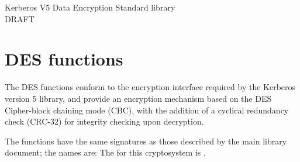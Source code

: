\setlength{\oddsidemargin}{0.25in}
\setlength{\evensidemargin}{-0.25in}
\setlength{\topmargin}{-.5in}
\setlength{\textheight}{9in}
\setlength{\parskip}{.1in}
\setlength{\parindent}{2em}
\setlength{\textwidth}{6.25in}

\pagestyle{headings}

\begin{center}
{\Huge Kerberos V5 Data Encryption Standard library} \\
{\Large DRAFT}
\end{center}
\section{DES functions}
The DES functions conform to the encryption interface required by the
Kerberos version 5 library, and provide an encryption mechanism based on
the DES Cipher-block chaining mode (CBC), with the addition of a
cyclical redundancy check (CRC-32) for integrity checking upon
decryption.

The functions have the same signatures as those described by the main
library document; the names are:
{\obeylines
{}
}
The  for this cryptosystem is
.


